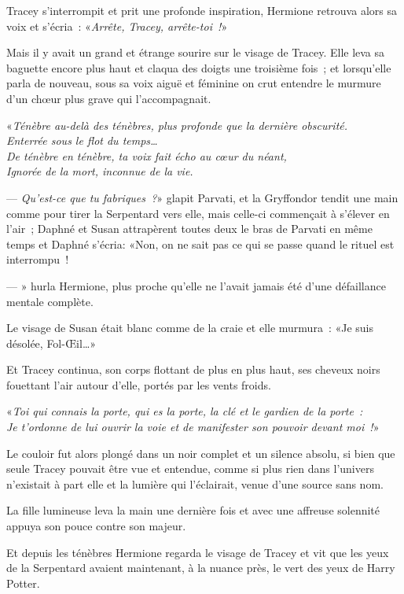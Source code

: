 Tracey s'interrompit et prit une profonde inspiration, Hermione retrouva alors sa voix et s'écria~: «\emph{Arrête, Tracey, arrête-toi~!}»

Mais il y avait un grand et étrange sourire sur le visage de Tracey. Elle leva sa baguette encore plus haut et claqua des doigts une troisième fois~; et lorsqu'elle parla de nouveau, sous sa voix aiguë et féminine on crut entendre le murmure d'un chœur plus grave qui l'accompagnait.

«\emph{Ténèbre au-delà des ténèbres, plus profonde que la dernière obscurité.\\
Enterrée sous le flot du temps…\\
De ténèbre en ténèbre, ta voix fait écho au cœur du néant,\\
Ignorée de la mort, inconnue de la vie.}

--- \emph{Qu'est-ce que tu fabriques~?}» glapit Parvati, et la Gryffondor tendit une main comme pour tirer la Serpentard vers elle, mais celle-ci commençait à s'élever en l'air~; Daphné et Susan attrapèrent toutes deux le bras de Parvati en même temps et Daphné s'écria: «Non, on ne sait pas ce qui se passe quand le rituel est interrompu~!

--- » hurla Hermione, plus proche qu'elle ne l'avait jamais été d'une défaillance mentale complète.

Le visage de Susan était blanc comme de la craie et elle murmura~: «Je suis désolée, Fol-Œil…»

Et Tracey continua, son corps flottant de plus en plus haut, ses cheveux noirs fouettant l'air autour d'elle, portés par les vents froids.

«\emph{Toi qui connais la porte, qui es la porte, la clé et le gardien de la porte~:\\ Je t'ordonne de lui ouvrir la voie et de manifester son pouvoir devant moi~!}»

Le couloir fut alors plongé dans un noir complet et un silence absolu, si bien que seule Tracey pouvait être vue et entendue, comme si plus rien dans l'univers n'existait à part elle et la lumière qui l'éclairait, venue d'une source sans nom.

La fille lumineuse leva la main une dernière fois et avec une affreuse solennité appuya son pouce contre son majeur.

Et depuis les ténèbres Hermione regarda le visage de Tracey et vit que les yeux de la Serpentard avaient maintenant, à la nuance près, le vert des yeux de Harry Potter.

